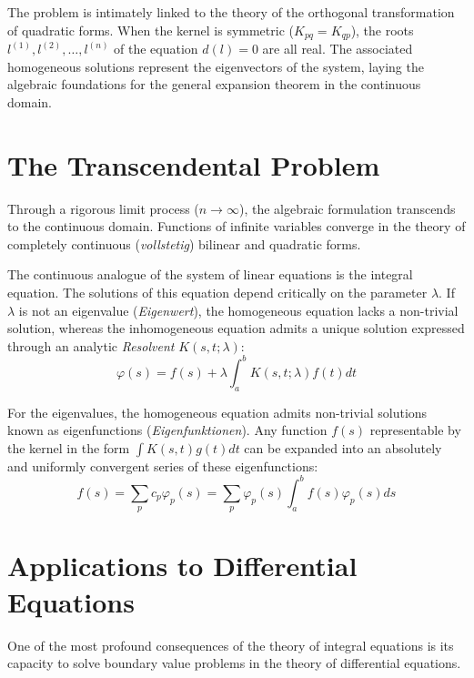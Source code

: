\documentclass[11pt,a4paper]{article}
\begin{document}
The problem is intimately linked to the theory of the orthogonal transformation of quadratic forms. When the kernel is symmetric ($K_{pq} = K_{qp}$), the roots $l^{(1)}, l^{(2)}, \dots, l^{(n)}$ of the equation $d(l) = 0$ are all real. The associated homogeneous solutions represent the eigenvectors of the system, laying the algebraic foundations for the general expansion theorem in the continuous domain.

\section{The Transcendental Problem}
Through a rigorous limit process ($n \to \infty$), the algebraic formulation transcends to the continuous domain. Functions of infinite variables converge in the theory of completely continuous (\textit{vollstetig}) bilinear and quadratic forms.

The continuous analogue of the system of linear equations is the integral equation. The solutions of this equation depend critically on the parameter $\lambda$. If $\lambda$ is not an eigenvalue (\textit{Eigenwert}), the homogeneous equation lacks a non-trivial solution, whereas the inhomogeneous equation admits a unique solution expressed through an analytic \textit{Resolvent} $K(s,t;\lambda)$:
\begin{equation}
\varphi(s) = f(s) + \lambda \int_{a}^{b} K(s,t;\lambda)f(t)dt
\end{equation}

For the eigenvalues, the homogeneous equation admits non-trivial solutions known as eigenfunctions (\textit{Eigenfunktionen}). Any function $f(s)$ representable by the kernel in the form $\int K(s,t)g(t)dt$ can be expanded into an absolutely and uniformly convergent series of these eigenfunctions:
\begin{equation}
f(s) = \sum_{p} c_p \varphi_p(s) = \sum_{p} \varphi_p(s) \int_{a}^{b} f(s)\varphi_p(s)ds
\end{equation}

\section{Applications to Differential Equations}
One of the most profound consequences of the theory of integral equations is its capacity to solve boundary value problems in the theory of differential equations.
\end{document}
